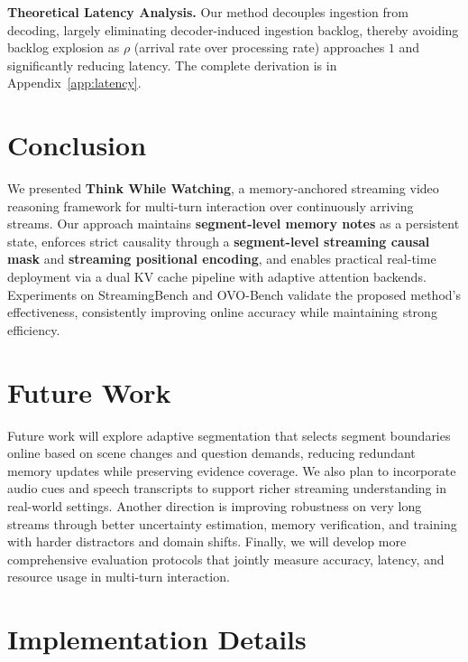 \documentclass{article}
\begin{document}
\noindent\textbf{Theoretical Latency Analysis.}
\label{sec:analysis_theory_latency}
Our method decouples ingestion from decoding, largely eliminating decoder-induced ingestion backlog, thereby avoiding backlog explosion as $\rho$ (arrival rate over processing rate) approaches $1$ and significantly reducing latency. The complete derivation is in Appendix~\ref{app:latency}.

\section{Conclusion}

We presented \textbf{Think While Watching}, a memory-anchored streaming video reasoning framework for multi-turn interaction over continuously arriving streams. Our approach maintains \textbf{segment-level memory notes} as a persistent state, enforces strict causality through a \textbf{segment-level streaming causal mask} and \textbf{streaming positional encoding}, and enables practical real-time deployment via a dual KV cache pipeline with adaptive attention backends. Experiments on StreamingBench and OVO-Bench validate the proposed method’s effectiveness, consistently improving online accuracy while maintaining strong efficiency.




\clearpage
\appendix

\renewcommand{\thetable}{A\arabic{table}}
\renewcommand{\thefigure}{A\arabic{figure}}
\setcounter{table}{0}
\setcounter{figure}{0}

\section{Future Work}
Future work will explore adaptive segmentation that selects segment boundaries online based on scene changes and question demands, reducing redundant memory updates while preserving evidence coverage. We also plan to incorporate audio cues and speech transcripts to support richer streaming understanding in real-world settings. Another direction is improving robustness on very long streams through better uncertainty estimation, memory verification, and training with harder distractors and domain shifts. Finally, we will develop more comprehensive evaluation protocols that jointly measure accuracy, latency, and resource usage in multi-turn interaction.

\section{Implementation Details}
\end{document}
